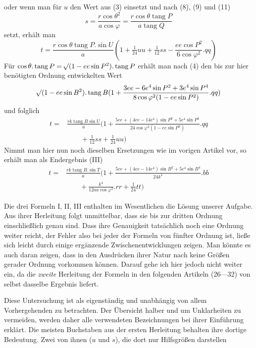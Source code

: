 %
oder wenn man für \(u\) den Wert aus (3) einsetzt und nach (8), (9) und (11)
\[
s=\frac{r\cos\theta^2}{a\cos\varphi}=\frac{r\cos\theta\operatorname{tang}P}{a\operatorname{tang}Q}
\]
setzt, erhält man
\[
t=\frac{r\cos\theta\operatorname{tang}P\mathord{.}\sin U}{a}(1+\tfrac1{24}uu+\tfrac1{12}ss-\frac{ee\cos P^2}{6\cos\varphi^2}\mathord{.}qq)
\]
Für \(\cos\theta\mathord{.}\operatorname{tang}P=\mathord{{}^{}\!\surd}(1-ee\sin P^2)\mathord{.}\operatorname{tang}P\) erhält man nach (4) den bis zur hier benötigten Ordnung entwickelten Wert
\[
\mathord{{}^{}\!\surd}(1-ee\sin B^2)\mathord{.}\operatorname{tang}B(1+\frac{3ee-6e^4\sin P^2+3e^4\sin P^4}{8\cos\varphi^2(1-ee\sin P^2)}\mathord{.}qq)
\]
und folglich
\[
\begin{aligned}
t={}&\frac{rk\operatorname{tang}B\sin U}{a}(1+\frac{5ee+(4ee-14e^4)\sin P^2+5e^4\sin P^4}{24\cos\varphi^2(1-ee\sin P^2)}\mathord{.}qq\\
&\qquad+\tfrac1{12}ss+\tfrac1{24}uu)
\end{aligned}
\]
Nimmt man hier nun noch dieselben Ersetzungen wie im vorigen Artikel vor, so erhält man als Endergebnis (III)
\[
\begin{aligned}
t={}&\frac{rk\operatorname{tang}B\mathord{.}\sin T}{a}(1+\frac{5ee+(4ee-14e^4)\sin B^2+5e^4\sin B^4}{24k^4}\mathord{.}bb\\
&\qquad+\frac{k^4}{12aa\cos\varphi^2}\mathord{.}rr+\tfrac1{24}tt)
\end{aligned}
\]

\indent Die drei Formeln I, II, III enthalten im Wesentlichen die Lösung unserer Aufgabe. Aus ihrer Herleitung folgt unmittelbar, dass sie bis zur dritten Ordnung einschließlich genau sind. Dass ihre Genauigkeit tatsächlich noch eine Ordnung weiter reicht, der Fehler also bei jeder der Formeln von fünfter Ordnung ist, ließe sich leicht durch einige ergänzende Zwischenentwicklungen zeigen. Man könnte es auch daran zeigen, dass in den Ausdrücken ihrer Natur nach keine Größen gerader Ordnung vorkommen können. Darauf gehe ich hier jedoch nicht weiter ein, da die \textit{zweite} Herleitung der Formeln in den folgenden Artikeln (26---32) von selbst dasselbe Ergebnis liefert.

Diese Untersuchung ist als eigenständig und unabhängig von allem Vorhergehenden zu betrachten. Der Übersicht halber und um Unklarheiten zu vermeiden, werden daher alle verwendeten Bezeichnungen bei ihrer Einführung erklärt. Die meisten Buchstaben aus der ersten Herleitung behalten ihre dortige Bedeutung. Zwei von ihnen (\(u\) und \(s\)), die dort nur Hilfsgrößen darstellen%
